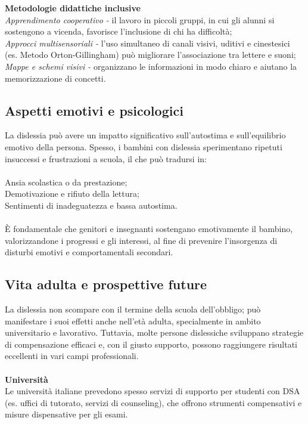 \documentclass[14pt]{extbook}
\begin{document}
\textbf{Metodologie didattiche inclusive}\\

\noindent\textit{Apprendimento cooperativo -} il lavoro in piccoli gruppi, in cui gli alunni si sostengono a vicenda, favorisce l’inclusione di chi ha difficoltà;\\
\textit{Approcci multisensoriali -} l’uso simultaneo di canali visivi, uditivi e cinestesici (es. Metodo Orton-Gillingham) può migliorare l’associazione tra lettere e suoni;\\
\textit{Mappe e schemi visivi -} organizzano le informazioni in modo chiaro e aiutano la memorizzazione di concetti.\\

\subsection{Aspetti emotivi e psicologici}
La dislessia può avere un impatto significativo sull’autostima e sull’equilibrio emotivo della persona. Spesso, i bambini con dislessia sperimentano ripetuti insuccessi e frustrazioni a scuola, il che può tradursi in:\\\\
	Ansia scolastica o da prestazione;\\
    Demotivazione e rifiuto della lettura;\\
    Sentimenti di inadeguatezza e bassa autostima.\\\\
È fondamentale che genitori e insegnanti sostengano emotivamente il bambino, valorizzandone i progressi e gli interessi, al fine di prevenire l’insorgenza di disturbi emotivi e comportamentali secondari.\\

\subsection{Vita adulta e prospettive future}
La dislessia non scompare con il termine della scuola dell’obbligo; può manifestare i suoi effetti anche nell’età adulta, specialmente in ambito universitario e lavorativo. Tuttavia, molte persone dislessiche sviluppano strategie di compensazione efficaci e, con il giusto supporto, possono raggiungere risultati eccellenti in vari campi professionali.\\\\

\textbf{Università}\\
Le università italiane prevedono spesso servizi di supporto per studenti con DSA (es. uffici di tutorato, servizi di counseling), che offrono strumenti compensativi e misure dispensative per gli esami.\\\\
\end{document}

